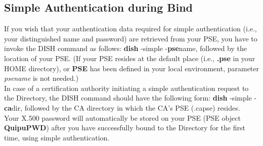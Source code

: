 \subsection{Simple Authentication during Bind}
If you wish that your authentication data required for simple authentication (i.e.,
your distinguished name and password) are retrieved from your PSE, you have to invoke the
DISH command as follows:
\bvtab
\1 {\bf dish} -simple -{\bf pse}name,
\evtab
followed by the location of your PSE. (If your PSE resides
at the default place (i.e., {\bf .pse} in your HOME directory), or {\bf PSE} has been 
defined in your local environment, parameter {\em psename} is not needed.)
\\ [1em]
In case of a certification authority initiating a simple authentication request
to the Directory, the DISH command should have the following form:
\bvtab
\1 {\bf dish} -simple -{\bf ca}dir,
\evtab
followed by the CA directory in which the CA's PSE (.capse) resides.
\\ [1em]
Your X.500 password will automatically be stored on your PSE (PSE object {\bf QuipuPWD})
after you have successfully bound to the Directory for the first time, using simple
authentication.


